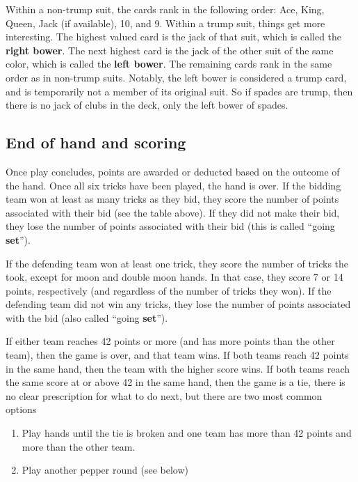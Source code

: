 \documentclass[11pt]{article}
\providecommand{\tightlist}{%
  \setlength{\itemsep}{0pt}%
  \setlength{\parskip}{0pt}%
}
\begin{document}
Within a non-trump suit, the cards rank in the following order: Ace,
King, Queen, Jack (if available), 10, and 9. Within a trump suit, things
get more interesting. The highest valued card is the jack of that suit,
which is called the \textbf{right bower}. The next highest card is the
jack of the other suit of the same color, which is called the
\textbf{left bower}. The remaining cards rank in the same order as in
non-trump suits. Notably, the left bower is considered a trump card, and
is temporarily not a member of its original suit. So if spades are
trump, then there is no jack of clubs in the deck, only the left bower
of spades.

\subsection{End of hand and scoring}\label{end-of-hand-and-scoring}

Once play concludes, points are awarded or deducted based on the outcome
of the hand. Once all six tricks have been played, the hand is over. If
the bidding team won at least as many tricks as they bid, they score the
number of points associated with their bid (see the table above). If
they did not make their bid, they lose the number of points associated
with their bid (this is called ``going \textbf{set}'').

If the defending team won at least one trick, they score the number of
tricks the took, except for moon and double moon hands. In that case,
they score 7 or 14 points, respectively (and regardless of the number of
tricks they won). If the defending team did not win any tricks, they
lose the number of points associated with the bid (also called ``going
\textbf{set}'').

If either team reaches 42 points or more (and has more points than the
other team), then the game is over, and that team wins. If both teams
reach 42 points in the same hand, then the team with the higher score
wins. If both teams reach the same score at or above 42 in the same
hand, then the game is a tie, there is no clear prescription for what to
do next, but there are two most common options

\begin{enumerate}
\def\labelenumi{\arabic{enumi}.}
\tightlist
\item
  Play hands until the tie is broken and one team has more than 42
  points and more than the other team.
\item
  Play another pepper round (see below)
\end{enumerate}
\end{document}
